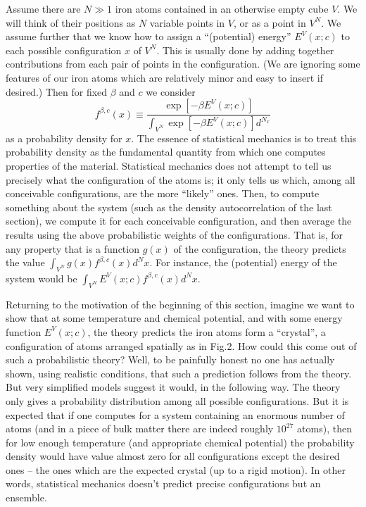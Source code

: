\documentclass[reqno]{stml-l}
\theoremstyle{plain}
\theoremstyle{definition}
\numberwithin{equation}{chapter}
\begin{document}
Assume there are $N\gg 1$ iron atoms contained in an otherwise empty cube $V$. We will think of their positions as $N$ variable points in $V$, or as a point in $V^{N}$. We assume further that we know how to assign a ``(potential) energy'' $E^{V}(x;c)$ to each possible configuration $x$ of $V^{N}$. This is usually done by adding together contributions from each pair of points in the configuration. (We are ignoring some features of our iron atoms which are relatively minor and easy to insert if desired.) Then for fixed $\beta$ and $c$ we consider
\begin{equation}
f^{\beta,c}(x)\equiv\frac{\exp[-\beta E^{V}(x;c)]}{\int_{V^{N}}\exp[-\beta E^{V}(x;c)]d^{N_{x}}}\label{ch02:eqn2.9}
\end{equation}
as a probability density for $x$. The essence of statistical mechanics is to treat this probability density as the fundamental quantity from which one computes properties of the material. Statistical mechanics does not attempt to tell us precisely what the configuration of the atoms is; it only tells us which, among all conceivable configurations, are the more ``likely'' ones. Then, to compute something about the system (such as the density autocorrelation of the last section), we compute it for each conceivable configuration, and then average the results using the above probabilistic weights of the configurations. That is, for any property that is a function $g(x)$ of the configuration, the theory predicts the value $\int_{V^{N}}g(x)f^{\beta,c}(x)d^{N}x$. For instance, the (potential) energy of the system would be $\int_{V^{N}}E^{V}(x;c)f^{\beta,c}(x)d^{N}x$.

Returning to the motivation of the beginning of this section, imagine we want to show that at some temperature and chemical potential, and with some energy function $E^{V}(x;c)$, the theory predicts the iron atoms form a ``crystal'', a configuration of atoms arranged spatially as in Fig.2. How could this come out of such a probabilistic theory? Well, to be painfully honest no one has actually shown, using realistic conditions, that such a prediction follows from the theory. But very simplified models suggest it would, in the following way. The theory only gives a probability distribution among all possible configurations. But it is expected that if one computes for a system containing an enormous number of atoms (and in a piece of bulk matter there are indeed roughly $10^{27}$ atoms), then for low enough temperature (and appropriate chemical potential) the probability density would have value almost zero for all configurations except the desired ones -- the ones which are the expected crystal (up to a rigid motion). In other words, statistical mechanics doesn't predict precise configurations but an ensemble.
\end{document}
